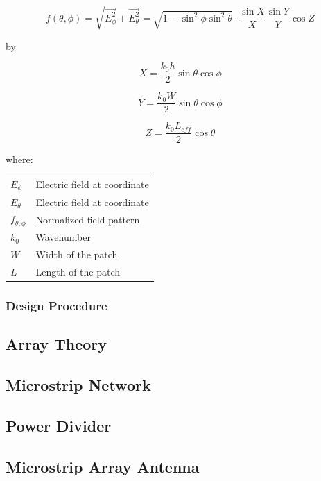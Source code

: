 \documentclass[11pt,a4paper]{article}
\makeatletter
\newenvironment{conditions}[1][where:]
  {#1 \begin{tabular}[t]{>{$}l<{$} @{${}={}$} l}}
  {\end{tabular}}
\makeatother
\begin{document}
\begin{equation}
        f(\theta,\phi) = \sqrt{\vec{E^2_\phi} + \vec{E^2_\theta}} = \sqrt{1 - \sin^2{\phi}\sin^2{\theta}} \cdot \frac{\sin{X}}{X}\frac{\sin{Y}}{Y}\cos{Z}
\end{equation}

by

\begin{equation}
        X = \frac{k_0 h}{2} \sin{\theta} \cos{\phi}
\end{equation}

\begin{equation}
        Y = \frac{k_0 W}{2} \sin{\theta} \cos{\phi}
\end{equation}

\begin{equation}
        Z = \frac{k_0 L_{eff}}{2} \cos{\theta}
\end{equation}



\begin{conditions}
 		E_{\phi}   	&	Electric field at coordinate \\
        E_{\theta}  &	Electric field at coordinate \\
        f_{\theta,\phi} & Normalized field pattern\\
        k_0			&	Wavenumber \\
 		W			&	Width of the patch\\
        L			&	Length of the patch\\
\end{conditions}
      

\subsubsection{Design Procedure}

\subsection{Array Theory}
\subsection{Microstrip Network}
\subsection{Power Divider}
\subsection{Microstrip Array Antenna}
\end{document}
